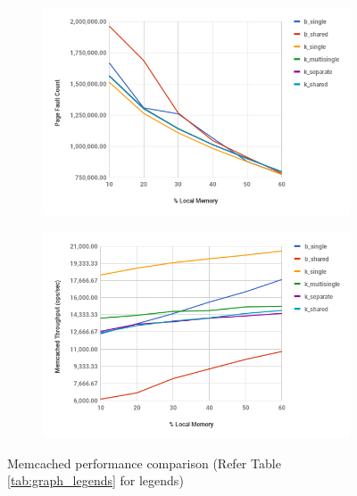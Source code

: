 \begin{figure}[t]
	\centering
	
	\begin{subfigure}[t]{\textwidth}
		\includegraphics[width=\textwidth]{evaluation/compare_pf_memcached.png}
		\caption{}
		\label{fig:compare_pf_memcached}
	\end{subfigure}
	\begin{subfigure}[t]{\textwidth}
		\includegraphics[width=\textwidth]{evaluation/compare_tp_memcached.png}
		\caption{}
		\label{fig:compare_tp_memcached}
	\end{subfigure}
	\caption{Memcached performance comparison (Refer Table \ref{tab:graph_legends} for legends)}
	\label{fig:compare_memcached}
\end{figure}
